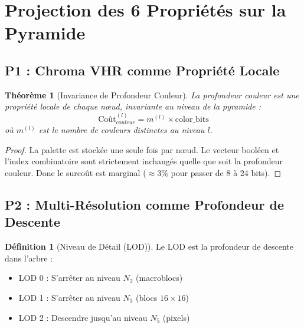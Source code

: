 \documentclass[12pt,a4paper]{article}
\newtheorem{theorem}{Théorème}[section]
\theoremstyle{definition}
\newtheorem{definition}{Définition}[section]
\begin{document}
	\section{Projection des 6 Propriétés sur la Pyramide}
	
	\subsection{P1 : Chroma VHR comme Propriété Locale}
	
	\begin{theorem}[Invariance de Profondeur Couleur]
		\label{thm:chroma_vhr}
		La profondeur couleur est une propriété locale de chaque nœud, invariante au niveau de la pyramide :
		\begin{equation}
			\text{Coût}_{couleur}^{(l)} = m^{(l)} \times \text{color\_bits}
		\end{equation}
		où $m^{(l)}$ est le nombre de couleurs distinctes au niveau $l$.
	\end{theorem}
	
	\begin{proof}
		La palette est stockée une seule fois par nœud. Le vecteur booléen et l'index combinatoire sont strictement inchangés quelle que soit la profondeur couleur. Donc le surcoût est marginal ($\approx 3\%$ pour passer de 8 à 24 bits).
	\end{proof}
	
	\subsection{P2 : Multi-Résolution comme Profondeur de Descente}
	
	\begin{definition}[Niveau de Détail (LOD)]
		\label{def:lod}
		Le LOD est la profondeur de descente dans l'arbre :
		\begin{itemize}
			\item LOD 0 : S'arrêter au niveau $N_2$ (macroblocs)
			\item LOD 1 : S'arrêter au niveau $N_3$ (blocs $16 \times 16$)
			\item LOD 2 : Descendre jusqu'au niveau $N_5$ (pixels)
		\end{itemize}
	\end{definition}
	
	\begin{algorithm}[h]
		\caption{Parcours Pyramidale Top-Down}
		\label{algo:parcours_pyramide}
		\begin{algorithmic}[1]
			\State \Return {}
			\EndIf
			\State \Return {}
			\EndIf
			\State {}
			\EndFor
			\EndProcedure
		\end{algorithmic}
	\end{algorithm}
	
\end{document}
